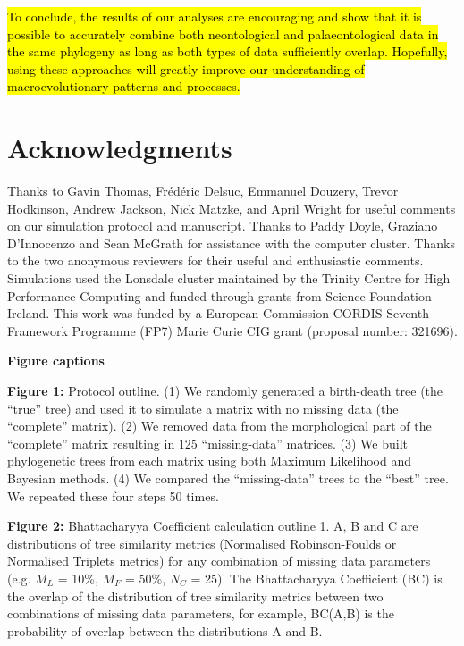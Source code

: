 \documentclass[12pt,letterpaper]{article}
\begin{document}
\hl{To conclude, the results of our analyses are encouraging and show that it is possible to accurately combine both neontological and palaeontological data in the same phylogeny as long as both types of data sufficiently overlap.
Hopefully, using these approaches will greatly improve our understanding of macroevolutionary patterns and processes.}


\section{Acknowledgments}
Thanks to Gavin Thomas, Fr\'{e}d\'{e}ric Delsuc, Emmanuel Douzery, Trevor Hodkinson, Andrew Jackson, Nick Matzke, and April Wright for useful comments on our simulation protocol and manuscript. Thanks to Paddy Doyle, Graziano D'Innocenzo and Sean McGrath for assistance with the computer cluster. Thanks to the two anonymous reviewers for their useful and enthusiastic %
comments. Simulations used the Lonsdale cluster maintained by the Trinity Centre for High Performance Computing and funded through grants from Science Foundation Ireland. This work was funded by a European Commission CORDIS Seventh Framework Programme (FP7) Marie Curie CIG grant (proposal number: 321696).

\nolinenumbers




\newpage
\noindent
\textbf{Figure captions}\\
\bigskip

\noindent
\textbf{Figure 1:} Protocol outline.
(1) We randomly generated a birth-death tree (the ``true'' tree) and used it to simulate a matrix with no missing data (the ``complete'' matrix).
(2) We removed data from the morphological part of the ``complete'' matrix resulting in 125 ``missing-data'' matrices.
(3) We built phylogenetic trees from each matrix using both Maximum Likelihood and Bayesian methods.
(4) We compared the ``missing-data'' trees to the ``best'' tree.
We repeated these four steps 50 times.\\
\bigskip

\noindent
\textbf{Figure 2:} Bhattacharyya Coefficient calculation outline 1. A, B and C are distributions of tree similarity metrics (Normalised Robinson-Foulds or Normalised Triplets metrics) for any combination of missing data parameters (e.g. $M_{L}$ = 10\%, $M_{F}$ = 50\%, $N_{C}$ = 25). The Bhattacharyya Coefficient (BC) is the overlap of the distribution of tree similarity metrics between two combinations of missing data parameters, for example, BC(A,B) is the probability of overlap between the distributions A and B.\\
\end{document}
